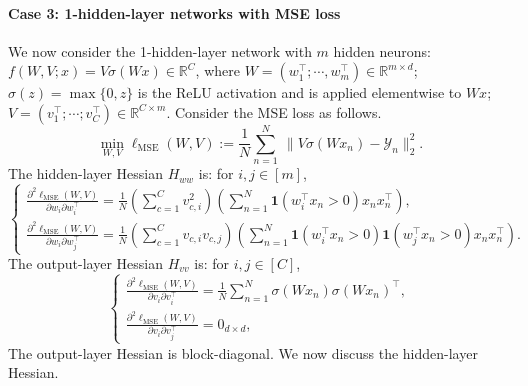 \documentclass{article}
\newcommand{\1}{^{(1)}}
\newcommand{\2}{^{(2)}}
\begin{document}
\paragraph{Case 3:  1-hidden-layer networks with MSE loss} We now consider the 1-hidden-layer network with $m$ hidden neurons: $f(W,V;x) =  V \sigma (Wx) \in \mathbb{R}^C$, where $W = (w_1^\top;\cdots, w_m^\top) \in\mathbb{R}^{m\times d}$; $\sigma(z) = \max\{0,z\}$ is the ReLU activation and is applied elementwise to $Wx$; $V = (v_1^\top;\cdots;v_C^\top)\in \mathbb{R}^{C\times m}$.  Consider the MSE loss as follows. 
\begin{equation}
    \label{eq_nn_mse}
    \min_{W,V} \ell_{\text{MSE}}(W,V) := \frac{1}{N}\sum_{n= 1}^N\ \|V \sigma (Wx_n)- \mathcal{Y}_n\|_2^2.
\end{equation}
The hidden-layer Hessian $H_{ww}$ is: for $i, j \in [m]$,
\begin{equation}
\label{eq_nn_mse_Hessian_w}
\left\{\begin{array}{l}
    \frac{\partial^2\ell_{\text{MSE}}(W,V)}{\partial w_i  \partial w_i^\top} = \frac{1}{N} \left(\sum_{c= 1}^C v_{c,i}^2 \right) \left(\sum_{n= 1}^N    \mathbf{1}(w_i^\top x_n >0) x_n x_n^\top\right),  \\
        \frac{\partial^2\ell_{\text{MSE}}(W,V)}{\partial w_i  \partial w_j^\top} = \frac{1}{N} \left(\sum_{c= 1}^C v_{c,i} v_{c,j} \right) \left(\sum_{n= 1}^N  \mathbf{1}(w_i^\top x_n >0) \mathbf{1}(w_j^\top x_n >0) x_n x_n^\top \right).  
\end{array}\right.
\end{equation}
The output-layer Hessian $H_{vv}$  is: for $i, j \in [C]$,
\begin{equation}
\label{eq_nn_mse_Hessian_v}
\left\{\begin{array}{l}
    \frac{\partial^2\ell_{\text{MSE}}(W,V)}{\partial v_i  \partial v_i^\top} = \frac{1}{N}\sum_{n= 1}^N \sigma(Wx_n) \sigma(Wx_n)^\top,  \\
    \frac{\partial^2\ell_{\text{MSE}}(W,V)}{\partial v_i  \partial v_j^\top} = 0_{d\times d},
\end{array}\right.
\end{equation}
The output-layer Hessian is block-diagonal. We now discuss the hidden-layer Hessian.
\end{document}
